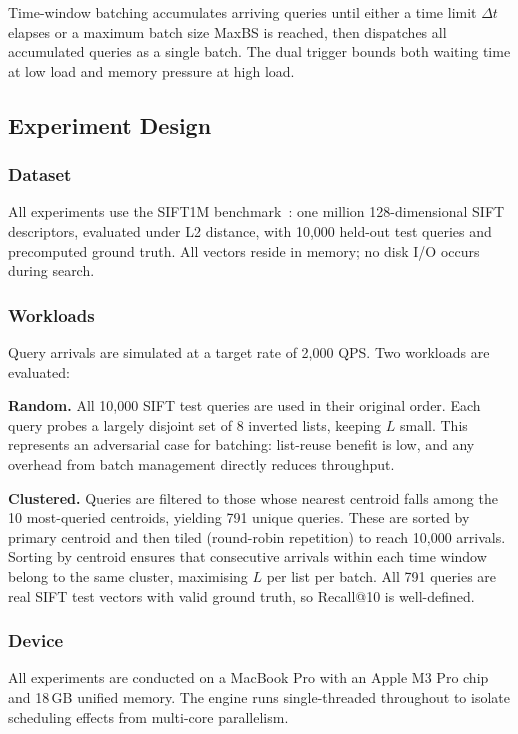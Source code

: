 \documentclass[sigconf, nonacm]{acmart}
\begin{document}
Time-window batching accumulates arriving queries until either a time
limit $\Delta t$ elapses or a maximum batch size MaxBS is reached, then
dispatches all accumulated queries as a single batch. The dual trigger
bounds both waiting time at low load and memory pressure at high load.

\subsection{Experiment Design}

\subsubsection{Dataset}

All experiments use the SIFT1M benchmark~\cite{pq2011}: one million
128-dimensional SIFT descriptors, evaluated under L2 distance, with
10,000 held-out test queries and precomputed ground truth. All vectors
reside in memory; no disk I/O occurs during search.

\subsubsection{Workloads}

Query arrivals are simulated at a target rate of 2,000 QPS. Two
workloads are evaluated:

\textbf{Random.} All 10,000 SIFT test queries are used in their original
order. Each query probes a largely disjoint set of 8 inverted lists,
keeping $L$ small. This represents an adversarial case for batching:
list-reuse benefit is low, and any overhead from batch management
directly reduces throughput.

\textbf{Clustered.} Queries are filtered to those whose nearest centroid
falls among the 10 most-queried centroids, yielding 791 unique queries.
These are sorted by primary centroid and then tiled (round-robin
repetition) to reach 10,000 arrivals. Sorting by centroid ensures that
consecutive arrivals within each time window belong to the same cluster,
maximising $L$ per list per batch. All 791 queries are real SIFT test
vectors with valid ground truth, so Recall@10 is well-defined.

\subsubsection{Device}

All experiments are conducted on a MacBook Pro with an Apple M3 Pro chip
and 18\,GB unified memory. The engine runs single-threaded throughout to
isolate scheduling effects from multi-core parallelism.
\end{document}
